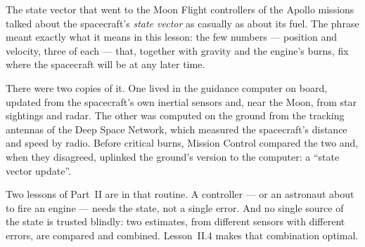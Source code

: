 \begin{curiosity}{The state vector that went to the Moon}
Flight controllers of the Apollo missions talked about the spacecraft's \emph{state vector} as casually as about its fuel. The phrase meant exactly what it means in this lesson: the few numbers — position and velocity, three of each — that, together with gravity and the engine's burns, fix where the spacecraft will be at any later time.

There were two copies of it. One lived in the guidance computer on board, updated from the spacecraft's own inertial sensors and, near the Moon, from star sightings and radar. The other was computed on the ground from the tracking antennas of the Deep Space Network, which measured the spacecraft's distance and speed by radio. Before critical burns, Mission Control compared the two and, when they disagreed, uplinked the ground's version to the computer: a \enquote{state vector update}.

Two lessons of Part~II are in that routine. A controller — or an astronaut about to fire an engine — needs the state, not a single error. And no single source of the state is trusted blindly: two estimates, from different sensors with different errors, are compared and combined. Lesson~II.4 makes that combination optimal.
\end{curiosity}


